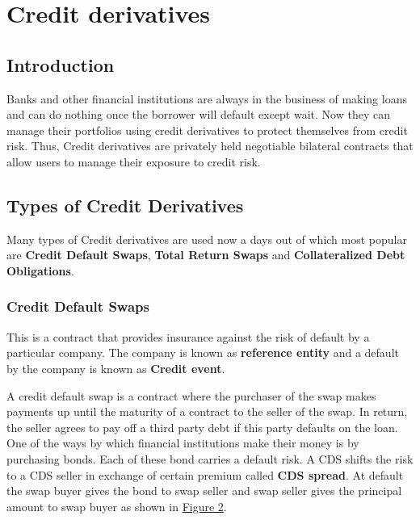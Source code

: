 \documentclass[11pt]{article}
\numberwithin{equation}{section}
\begin{document}
\section{Credit derivatives}
\medskip

\subsection{Introduction} 
\medskip 

Banks and other financial institutions are always in the business of making loans and can do nothing once the borrower will default except wait. Now they can manage their portfolios using credit derivatives to protect themselves from credit risk. Thus, Credit derivatives are privately held negotiable bilateral contracts that allow users to manage their exposure to credit risk.  

\subsection{Types of Credit Derivatives}
\medskip

 Many types of Credit derivatives are used now a days out of which most popular are \textbf{Credit Default Swaps}, \textbf{Total Return Swaps} and \textbf{Collateralized Debt Obligations}.
\subsubsection{{Credit Default Swaps}}
\medskip

This is a contract that provides insurance against the risk of default by a particular company. The company is known as \textbf{reference entity} and a default by the company is known as \textbf{Credit event}.\medskip

\hspace{1cm}A credit default swap is a contract where the purchaser of the swap makes payments up until the maturity of a contract to the seller of the swap. In return, the seller agrees to pay off a third party debt if this party defaults on the loan. One of the ways by which financial institutions make their money is by purchasing bonds. Each of these bond carries a default risk. A CDS shifts the risk to a CDS seller in exchange of certain premium called \textbf{CDS spread}. At default the swap buyer gives the bond to swap seller and swap seller gives the principal amount to swap buyer as shown in \hyperref[f2_a]{Figure 2}.
\end{document}
